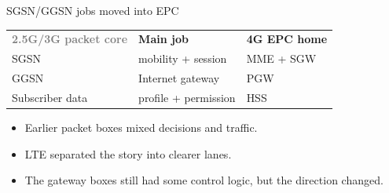 %
\begin{frame}{SGSN/GGSN jobs moved into EPC}
  \vspace{0.2em}
  \centering
  \begin{tabular}{@{}p{}p{}p{}@{}}
    \textbf{\textcolor{gray}{2.5G/3G packet core}} &
    \textbf{\textcolor{ranblue}{Main job}} &
    \textbf{\textcolor{coreorange}{4G EPC home}}\\[0.35em]
    SGSN &
    mobility + session &
    MME + SGW\\[0.7em]
    GGSN &
    Internet gateway &
    PGW\\[0.7em]
    Subscriber data &
    profile + permission &
    HSS
  \end{tabular}

  \vspace{0.9em}
  \begin{itemize}\itemsep3pt
    \item Earlier packet boxes mixed decisions and traffic.
    \item LTE separated the story into clearer lanes.
    \item The gateway boxes still had some control logic, but the direction changed.
  \end{itemize}

  \vspace{0.3em}
\end{frame}

